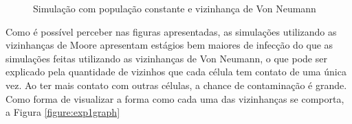 \documentclass[a4paper,12pt]{article}
\begin{document}
\begin{figure}[!ht]
\qquad
{}
\qquad
{}
\caption{Simulação com população constante e vizinhança de Von Neumann}
\label{figure:exp1vonneumann}
\end{figure}

Como é possível perceber nas figuras apresentadas, as simulações utilizando as vizinhanças de Moore apresentam estágios bem maiores de infecção do que as simulações feitas utilizando as vizinhanças de Von Neumann, o que pode ser explicado pela quantidade de vizinhos que cada célula tem contato de uma única vez. Ao ter mais contato com outras células, a chance de contaminação é grande. Como forma de visualizar a forma como cada uma das vizinhanças se comporta, a Figura \ref{figure:exp1graph}
\end{document}
